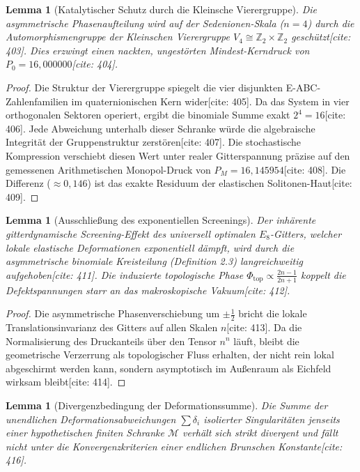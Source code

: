 \documentclass[11pt,a4paper]{article}
\newcommand{\Eoct}{E_8}
\newtheorem{lemma}[theorem]{Lemma}
\theoremstyle{definition}
\begin{document}
	\begin{lemma}[Katalytischer Schutz durch die Kleinsche Vierergruppe]
		Die asymmetrische Phasenaufteilung wird auf der Sedenionen-Skala ($n=4$) durch die Automorphismengruppe der Kleinschen Vierergruppe $V_4 \cong \mathbb{Z}_2 \times \mathbb{Z}_2$ geschützt[cite: 403]. Dies erzwingt einen nackten, ungestörten Mindest-Kerndruck von $P_0 = 16{,}000000$[cite: 404].
	\end{lemma}
	
	\begin{proof}
		Die Struktur der Vierergruppe spiegelt die vier disjunkten E-ABC-Zahlenfamilien im quaternionischen Kern wider[cite: 405]. Da das System in vier orthogonalen Sektoren operiert, ergibt die binomiale Summe exakt $2^4 = 16$[cite: 406]. Jede Abweichung unterhalb dieser Schranke würde die algebraische Integrität der Gruppenstruktur zerstören[cite: 407]. Die stochastische Kompression verschiebt diesen Wert unter realer Gitterspannung präzise auf den gemessenen Arithmetischen Monopol-Druck von $P_M = 16{,}145954$[cite: 408]. Die Differenz ($\approx 0{,}146$) ist das exakte Residuum der elastischen Solitonen-Haut[cite: 409].
	\end{proof}
	
	\begin{lemma}[Ausschließung des exponentiellen Screenings]
		Der inhärente gitterdynamische Screening-Effekt des universell optimalen $\Eoct$-Gitters, welcher lokale elastische Deformationen exponentiell dämpft, wird durch die asymmetrische binomiale Kreisteilung (Definition 2.3) langreichweitig aufgehoben[cite: 411]. Die induzierte topologische Phase $\Phi_{\text{top}} \propto \frac{2n-1}{2n+1}$ koppelt die Defektspannungen starr an das makroskopische Vakuum[cite: 412].
	\end{lemma}
	
	\begin{proof}
		Die asymmetrische Phasenverschiebung um $\pm \frac{1}{2}$ bricht die lokale Translationsinvarianz des Gitters auf allen Skalen $n$[cite: 413]. Da die Normalisierung des Druckanteils über den Tensor $n^n$ läuft, bleibt die geometrische Verzerrung als topologischer Fluss erhalten, der nicht rein lokal abgeschirmt werden kann, sondern asymptotisch im Außenraum als Eichfeld wirksam bleibt[cite: 414].
	\end{proof}
	
	\begin{lemma}[Divergenzbedingung der Deformationssumme]
		Die Summe der unendlichen Deformationsabweichungen $\sum \delta_i$ isolierter Singularitäten jenseits einer hypothetischen finiten Schranke $\mathcal{M}$ verhält sich strikt divergent und fällt nicht unter die Konvergenzkriterien einer endlichen Brunschen Konstante[cite: 416].
	\end{lemma}
	
\end{document}
